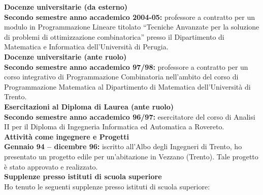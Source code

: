 \documentclass[10pt]{article}
\newcommand{\subvoice}[1] { {\large \bf #1} \smallskip\\ }
\begin{document}
\subvoice{Docenze universitarie (da esterno)}
{\bf Secondo semestre anno accademico 2004-05:}
professore a contratto per un modulo in Programmazione Lineare
titolato ``Tecniche Anvanzate per la soluzione di problemi di ottimizzazione
combinatorica''
presso il Dipartimento di Matematica e Informatica
dell'Universit\`a di Perugia.\\

\subvoice{Docenze universitarie (ante ruolo)}
{\bf Secondo semestre anno accademico 97/98:}
professore a contratto per 
un corso integrativo di Programmazione Combinatoria
nell'ambito del corso di Programmazione Matematica
al Dipartimento di Matematica dell'Universit\`a di Trento.\\

\subvoice{Esercitazioni al Diploma di Laurea (ante ruolo)}
{\bf Secondo semestre anno accademico 96/97:}
esercitatore del corso di Analisi II
per il Diploma di Ingegneria Informatica ed Automatica a Rovereto.\\

\subvoice{Attivit\`a come ingegnere e Progetti}
{\bf Gennaio 94 -- dicembre 96:}
iscritto all'Albo degli Ingegneri di Trento,
ho presentato un progetto edile
per un'abitazione in Vezzano (Trento).
Tale progetto \`e stato approvato e realizzato.\\


\subvoice{Supplenze presso istituti di scuola superiore}
%
%
%
Ho tenuto le seguenti supplenze
presso istituti di scuola superiore:\\
\end{document}
